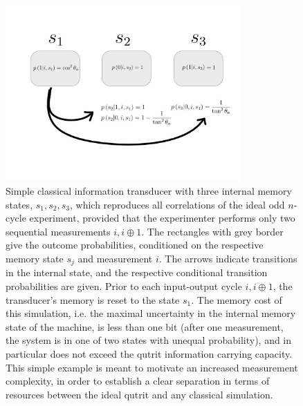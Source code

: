 \begin{figure}
\centering
\includegraphics[width=0.8\textwidth]{images/twomnts.jpg}
\caption{Simple classical information transducer with three internal memory states, $s_1, s_2, s_3$, which reproduces all correlations of the ideal odd $n$-cycle experiment, provided that the experimenter performs only two sequential measurements $i, i\oplus 1$. The rectangles with grey border give the outcome probabilities, conditioned on the respective memory state $s_j$ and measurement $i$. The arrows indicate transitions in the internal state, and the respective conditional transition probabilities are given. Prior to each input-output cycle $i,i\oplus 1$, the transducer's memory is reset to the state $s_1$.
The memory cost of this simulation, i.e. the maximal uncertainty in the internal memory state of the machine, is less than one bit (after one measurement, the system is in one of two states with unequal probability), and in particular does not exceed the qutrit information carrying capacity. This simple example is meant to motivate an increased measurement complexity, in order to establish a clear separation in terms of resources between the ideal qutrit and any classical simulation.}
\label{fig:twomnts}
\end{figure}





